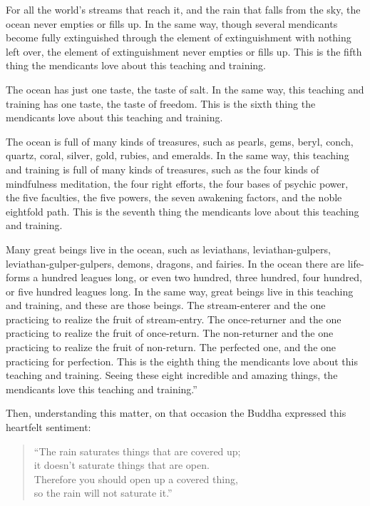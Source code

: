 \documentclass[12pt,openany]{book}%
\begin{document}
For all the world’s streams that reach it, and the rain that falls from the sky, the ocean never empties or fills up. In the same way, though several mendicants become fully extinguished through the element of extinguishment with nothing left over, the element of extinguishment never empties or fills up. This is the fifth thing the mendicants love about this teaching and training. 

The ocean has just one taste, the taste of salt. In the same way, this teaching and training has one taste, the taste of freedom. This is the sixth thing the mendicants love about this teaching and training. 

The ocean is full of many kinds of treasures, such as pearls, gems, beryl, conch, quartz, coral, silver, gold, rubies, and emeralds. In the same way, this teaching and training is full of many kinds of treasures, such as the four kinds of mindfulness meditation, the four right efforts, the four bases of psychic power, the five faculties, the five powers, the seven awakening factors, and the noble eightfold path. This is the seventh thing the mendicants love about this teaching and training. 

Many great beings live in the ocean, such as leviathans, leviathan-gulpers, leviathan-gulper-gulpers, demons, dragons, and fairies. In the ocean there are life-forms a hundred leagues long, or even two hundred, three hundred, four hundred, or five hundred leagues long. In the same way, great beings live in this teaching and training, and these are those beings. The stream-enterer and the one practicing to realize the fruit of stream-entry. The once-returner and the one practicing to realize the fruit of once-return. The non-returner and the one practicing to realize the fruit of non-return. The perfected one, and the one practicing for perfection. This is the eighth thing the mendicants love about this teaching and training. Seeing these eight incredible and amazing things, the mendicants love this teaching and training.” 

Then, understanding this matter, on that occasion the Buddha expressed this heartfelt sentiment: 

\begin{verse}%
“The rain saturates things that are covered up; \\
it doesn’t saturate things that are open. \\
Therefore you should open up a covered thing, \\
so the rain will not saturate it.” 

%
\end{verse}
\end{document}
